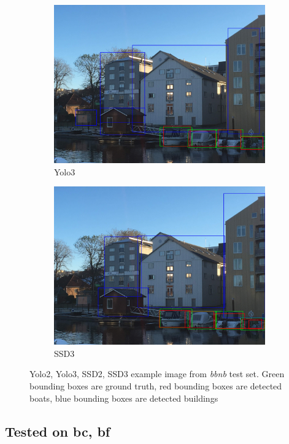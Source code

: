 \begin{figure}[h!]
\begin{subfigure}{.5\textwidth}
  \centering
  \includegraphics[width=0.8\linewidth]{results/case_buildings/prec_recall/yolo/IMG_2077_build.jpg}
  \caption{Yolo3}
  \label{fig:ex_bbnb_yolo3}
\end{subfigure}%
\begin{subfigure}{.5\textwidth}
  \centering
  \includegraphics[width=.8\linewidth]{results/case_buildings/prec_recall/ssd/IMG_2077_build.jpg}
  \caption{SSD3}
  \label{fig:ex_bbnb_ssd3}
\end{subfigure}
\caption{Yolo2, Yolo3, SSD2, SSD3 example image from \textit{bbnb} test set. Green bounding boxes are ground truth, red bounding boxes are detected boats, blue bounding boxes are detected buildings}
\label{img:bbnb_ex}
\end{figure}

\newpage

\subsection{Tested on bc, bf}

